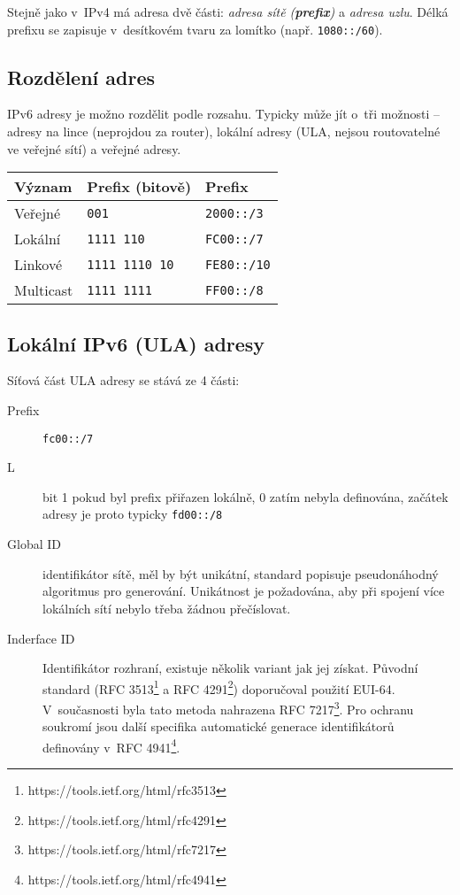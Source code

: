 Stejně jako v~IPv4 má adresa dvě části: \emph{adresa sítě ({\bf prefix})} a
\emph{adresa uzlu}. Délká prefixu se zapisuje v~desítkovém tvaru za lomítko
(např. {\tt 1080::/60}).

\subsection{Rozdělení adres}
IPv6 adresy je možno rozdělit podle rozsahu. Typicky může jít o~tři
možnosti -- adresy na lince (neprojdou za router), lokální adresy (ULA, nejsou
routovatelné ve veřejné sítí) a veřejné adresy.

\begin{table}[ht!]
    \begin{center}
        \begin{tabular}{l|l|l}
            Význam & Prefix (bitově) & Prefix \\
            \hline\hline
            Veřejné  & {\tt 001} & {\tt 2000::/3} \\
            \hline
            Lokální  & {\tt 1111 110} & {\tt FC00::/7} \\
            \hline
            Linkové  & {\tt 1111 1110 10} & {\tt FE80::/10} \\
            \hline
            Multicast & {\tt 1111 1111} & {\tt FF00::/8} \\
            \hline
        \end{tabular}
    \end{center}
\end{table}

\subsection{Lokální IPv6 (ULA) adresy}\label{ula}
Síťová část ULA adresy se stává ze 4 části:
\begin{description}
    \item [Prefix] {\tt fc00::/7}
    \item [L] bit 1 pokud byl prefix přiřazen lokálně, 0 zatím nebyla
        definována, začátek adresy je proto typicky {\tt fd00::/8}
    \item [Global ID] identifikátor sítě, měl by být unikátní, standard
        popisuje pseudonáhodný algoritmus pro generování. Unikátnost je
        požadována, aby při spojení více lokálních sítí nebylo třeba žádnou
        přečíslovat.
    \item [Inderface ID] Identifikátor rozhraní, existuje několik variant jak
        jej získat. Původní standard (RFC
        3513\footnote{https://tools.ietf.org/html/rfc3513} a RFC
        4291\footnote{https://tools.ietf.org/html/rfc4291}) doporučoval použití
        EUI-64. V~současnosti byla tato metoda nahrazena RFC
        7217\footnote{https://tools.ietf.org/html/rfc7217}. Pro ochranu
        soukromí jsou další specifika automatické generace identifikátorů
        definovány v~RFC 4941\footnote{https://tools.ietf.org/html/rfc4941}.
\end{description}


